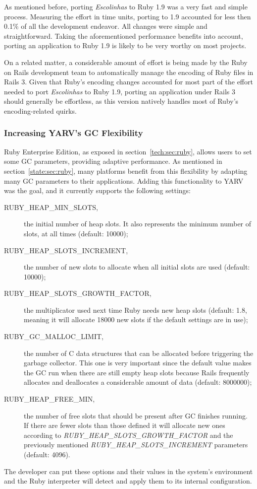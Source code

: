 As mentioned before, porting \textit{Escolinhas} to Ruby 1.9 was a very fast and simple process. Measuring the effort in time units, porting to 1.9 accounted for less then 0.1\% of all the development endeavor. All changes were simple and straightforward. Taking the aforementioned performance benefits into account, porting an application to Ruby 1.9 is likely to be very worthy on most projects.

On a related matter, a considerable amount of effort is being made by the Ruby on Rails development team to automatically manage the encoding of Ruby files in Rails 3. Given that Ruby's encoding changes accounted for most part of the effort needed to port \textit{Escolinhas} to Ruby 1.9, porting an application under Rails 3 should generally be effortless, as this version natively handles most of Ruby's encoding-related quirks.

\subsubsection{Increasing YARV's GC Flexibility}
Ruby Enterprise Edition, as exposed in section~\ref{tech:sec:ruby}, allows users to set some GC parameters, providing adaptive performance. As mentioned in section~\ref{state:sec:ruby}, many platforms benefit from this flexibility by adapting many GC parameters to their applications. Adding this functionality to YARV was the goal, and it currently supports the following settings:
\begin{description}
  \item[RUBY\_HEAP\_MIN\_SLOTS,] the initial number of heap slots. It also represents the minimum number of slots, at all times (default: 10000);
  \item[RUBY\_HEAP\_SLOTS\_INCREMENT,] the number of new slots to allocate when all initial slots are used (default: 10000);
  \item[RUBY\_HEAP\_SLOTS\_GROWTH\_FACTOR,] the multiplicator used next time Ruby needs new heap slots (default: 1.8, meaning it will allocate 18000 new slots if the default settings are in use);
  \item[RUBY\_GC\_MALLOC\_LIMIT,] the number of C data structures that can be allocated before triggering the garbage collector. This one is very important since the default value makes the GC run when there are still empty heap slots because Rails frequently allocates and deallocates a considerable amount of data (default: 8000000);
  \item[RUBY\_HEAP\_FREE\_MIN,] the number of free slots that should be present after GC finishes running. If there are fewer slots than those defined it will allocate new ones according to \textit{RUBY\_HEAP\_SLOTS\_GROWTH\_FACTOR} and the previously mentioned \textit{RUBY\_HEAP\_SLOTS\_INCREMENT} parameters (default: 4096).
\end{description}
The developer can put these options and their values in the system's environment and the Ruby interpreter will detect and apply them to its internal configuration.

